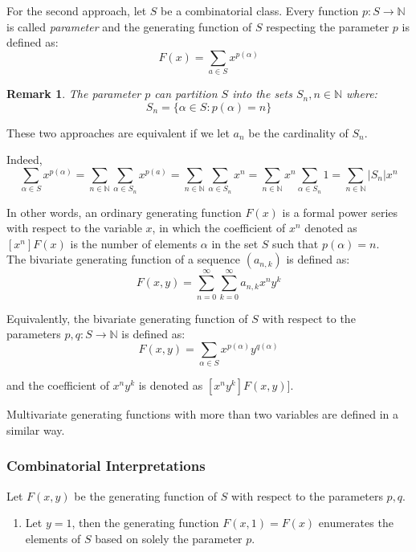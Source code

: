 \documentclass[12pt]{report}
\newtheorem*{remark}{Remark}
\begin{document}
{\noindent For the second approach, let $S$ be a combinatorial class. Every function $p : S \to \mathbb{N}$ is called {\em parameter} and the generating function of $S$ respecting the parameter $p$ is defined as:
\[F(x)=\sum\limits_{a\in S} x^{p(\alpha)}\]

\begin{remark}The parameter $p$ can partition $S$ into the sets $S_n,n\in \mathbb{N}$ where:
\[S_n=\{\alpha \in S: p(\alpha)=n\}\]
\end{remark}
\noindent These two approaches are equivalent if we let $a_n$ be the cardinality of $S_n$.

\noindent Indeed,
\[ \sum\limits_{\alpha \in S} x^{p(\alpha)} = \sum\limits_{n \in \mathbb{N}} \sum\limits_{\alpha \in S_n} x^{p(a)} = 
\sum\limits_{n \in \mathbb{N}} \sum\limits_{\alpha \in S_n} x^n = \sum\limits_{n \in \mathbb{N}} x^n \sum\limits_{\alpha \in S_n} 1 =
\sum\limits_{n \in \mathbb{N}} |S_n| x^n \]

\noindent In other words, an ordinary generating function $F(x)$ is a formal power series with respect to the variable $x$, in which the coefficient of $x^n$ denoted as $[x^n]F(x)$ is the number of elements $\alpha$ in the set $S$ such that $p(\alpha)=n$.\\

\noindent The bivariate generating function of a sequence $(a_{n,k})$ is defined as:
\[F(x,y)=\sum\limits_{n=0}^\infty \sum\limits_{k=0}^\infty a_{n,k} x^n y^k\]

\noindent Equivalently, the bivariate generating function of $S$ with respect to the parameters $p,q: S \to \mathbb{N}$ is defined as:
\[F(x,y)=\sum\limits_{\alpha \in S} x^{p(\alpha)} y^{q(\alpha)}\]

\noindent and the coefficient of $x^n y^k$ is denoted as $[x^n y^k]F(x,y)]$. 

\noindent Multivariate generating functions with more than two variables are defined in a similar way. 



\subsubsection{Combinatorial Interpretations}


\noindent Let $F(x,y)$ be the generating function of $S$ with respect to the parameters $p,q$.

\begin{enumerate}[label=\roman{*})]

\item Let $y=1$, then the generating function $F(x,1)=F(x)$ enumerates the elements of $S$ based on solely the parameter $p$.


\end{enumerate}}
\end{document}

